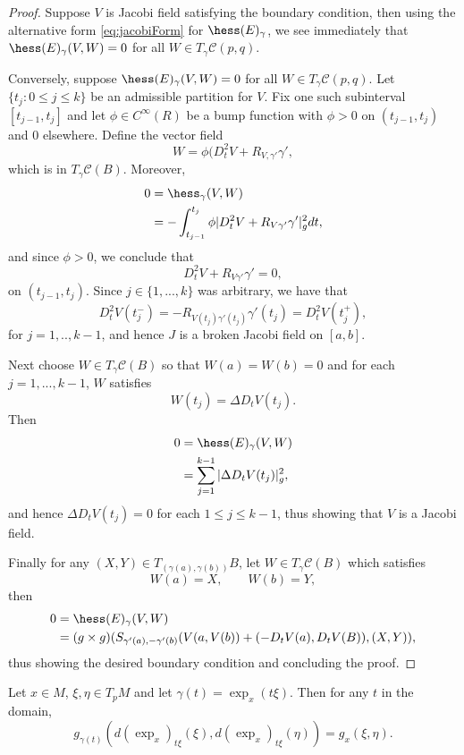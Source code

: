 \begin{proof}
Suppose $V$ is Jacobi field satisfying the boundary condition, then using the alternative form \cref{eq:jacobiForm} for $\hess(E)_\gamma$, we see immediately that $\hess(E)_\gamma(V,W)=0$ for all $W\in T_\gamma\mathcal{C}(p,q)$.

Conversely, suppose $\hess(E)_\gamma(V,W)=0$ for all $W\in T_\gamma\mathcal{C}(p,q)$.  Let $\{t_j:0\leq j\leq k\}$ be an admissible partition for $V$.  Fix one such subinterval $[t_{j-1},t_j]$ and let $\phi\in C^\infty(R)$ be a bump function with $\phi>0$ on $(t_{j-1},t_j)$ and $0$ elsewhere.  Define the vector field
$$W=\phi(D_t^2V+R_{V,\gamma'}\gamma',$$
which is in $T_\gamma\mathcal{C}(B)$.  Moreover,
\begin{align*}
	0&=\hess_\gamma(V,W)\\
	&=-\int_{t_{j-1}}^{t_j}\phi|D_t^2V+R_{V\gamma'}\gamma'|_g^2dt,
\end{align*}
and since $\phi>0$, we conclude that
$$D_t^2V+R_{V\gamma'}\gamma'=0,$$
on $(t_{j-1},t_j)$.  Since $j\in\{1,...,k\}$ was arbitrary, we have that
$$D_t^2V(t_j^-)=-R_{V(t_j)\gamma'(t_j)}\gamma'(t_j)=D_t^2V(t_j^+),$$
for $j=1,..,k-1$, and hence $J$ is a broken Jacobi field on $[a,b]$.

Next choose $W\in T_\gamma\mathcal{C}(B)$ so that $W(a)=W(b)=0$ and for each $j=1,...,k-1$, $W$ satisfies
$$W(t_j)=\Delta D_tV(t_j).$$
Then
\begin{align*}
	0&=\hess(E)_\gamma(V,W)\\
	&=\sum_{j=1}^{k-1}|\Delta D_tV(t_j)|_g^2,
\end{align*}
and hence $\Delta D_tV(t_j)=0$ for each $1\leq j\leq k-1$, thus showing that $V$ is a Jacobi field.

Finally for any $(X,Y)\in T_{(\gamma(a),\gamma(b))}B$, let $W\in T_\gamma\mathcal{C}(B)$ which satisfies
$$W(a)=X,\qquad W(b)=Y,$$
then
\begin{align*}
	0&=\hess(E)_\gamma(V,W)\\
	&=(g\times g)(S_{\gamma'(a),-\gamma'(b)}(V(a,V(b))+(-D_tV(a),D_tV(B)),(X,Y)),
\end{align*}
thus showing the desired boundary condition and concluding the proof.



\end{proof}

\begin{lem}\label{thm:gaussLemma}
    Let $x\in M$, $\xi,\eta\in T_pM$ and let $\gamma(t)=\exp_x(t\xi)$.  Then for any $t$ in the domain,
    $$g_{\gamma(t)}(d(\exp_x)_{t\xi}(\xi),d(\exp_x)_{t\xi}(\eta))=g_x(\xi,\eta).$$
\end{lem}

